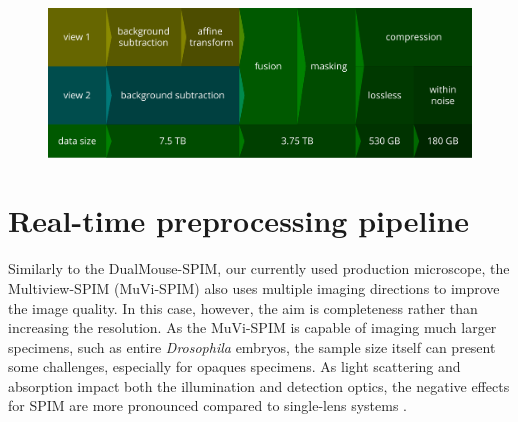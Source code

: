   \begin{figure}
    \centering
    \includegraphics[width=\textwidth]{pipeline}
    \label{fig:pipeline}
  \end{figure}








\section{Real-time preprocessing pipeline}

Similarly to the DualMouse-SPIM, our currently used production microscope, the Multiview-SPIM (MuVi-SPIM) \cite{krzic_multiview_2012} also uses multiple imaging directions to improve the image quality. In this case, however, the aim is completeness rather than increasing the resolution. As the MuVi-SPIM is capable of imaging much larger specimens, such as entire \textit{Drosophila} embryos, the sample size itself can present some challenges, especially for opaques specimens. As light scattering and absorption impact both the illumination and detection optics, the negative effects for SPIM are more pronounced compared to single-lens systems \cite{de_medeiros_deep_2016}.




